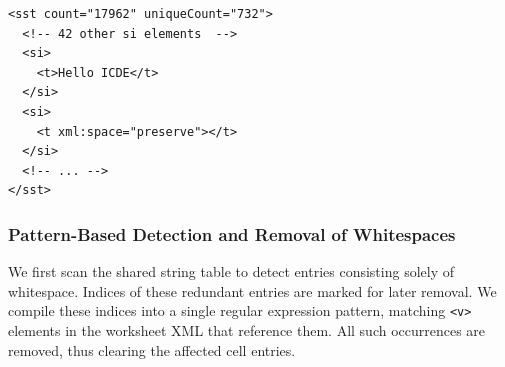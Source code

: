 \begin{lstlisting}[caption={Shared String Table (\texttt{sst}) in \texttt{sharedStrings.xml}}, label={lst:sharedStringsSst}, firstnumber=48]
<sst count="17962" uniqueCount="732">
  <!-- 42 other si elements  -->
  <si>
    <t>Hello ICDE</t>
  </si>
  <si>
    <t xml:space="preserve"></t>
  </si>
  <!-- ... -->
</sst>  
\end{lstlisting}



\subsubsection{Pattern-Based Detection and Removal of Whitespaces}
We first scan the shared string table to detect entries consisting solely of whitespace. Indices of these redundant entries are marked for later removal. We compile these indices into a single regular expression pattern, matching \texttt{<v>} elements in the worksheet XML that reference them. All such occurrences are removed, thus clearing the affected cell entries.







